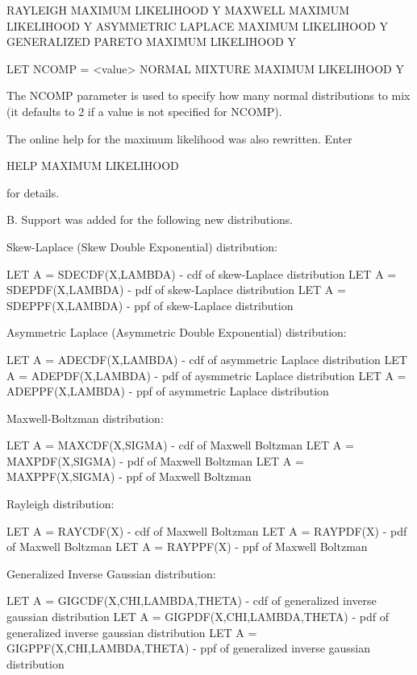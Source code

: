 {             RAYLEIGH MAXIMUM LIKELIHOOD Y
             MAXWELL MAXIMUM LIKELIHOOD Y
             ASYMMETRIC LAPLACE MAXIMUM LIKELIHOOD Y
             GENERALIZED PARETO MAXIMUM LIKELIHOOD Y

             LET NCOMP = <value>
             NORMAL MIXTURE MAXIMUM LIKELIHOOD Y

          The NCOMP parameter is used to specify how many normal
          distributions to mix (it defaults to 2 if a value is not
          specified for NCOMP).

       The online help for the maximum likelihood was also rewritten.
       Enter

          HELP MAXIMUM LIKELIHOOD

       for details.

    B. Support was added for the following new distributions.

       Skew-Laplace (Skew Double Exponential) distribution:

       LET A = SDECDF(X,LAMBDA)    - cdf of skew-Laplace distribution
       LET A = SDEPDF(X,LAMBDA)    - pdf of skew-Laplace distribution
       LET A = SDEPPF(X,LAMBDA)    - ppf of skew-Laplace distribution

       Asymmetric Laplace (Asymmetric Double Exponential) distribution:

       LET A = ADECDF(X,LAMBDA)    - cdf of asymmetric Laplace
                                     distribution
       LET A = ADEPDF(X,LAMBDA)    - pdf of aysmmetric Laplace
                                     distribution
       LET A = ADEPPF(X,LAMBDA)    - ppf of asymmetric Laplace
                                     distribution

       Maxwell-Boltzman distribution:

       LET A = MAXCDF(X,SIGMA)     - cdf of Maxwell Boltzman
       LET A = MAXPDF(X,SIGMA)     - pdf of Maxwell Boltzman
       LET A = MAXPPF(X,SIGMA)     - ppf of Maxwell Boltzman

       Rayleigh distribution:

       LET A = RAYCDF(X)           - cdf of Maxwell Boltzman
       LET A = RAYPDF(X)           - pdf of Maxwell Boltzman
       LET A = RAYPPF(X)           - ppf of Maxwell Boltzman

       Generalized Inverse Gaussian distribution:

       LET A = GIGCDF(X,CHI,LAMBDA,THETA) - cdf of generalized inverse
                                            gaussian distribution
       LET A = GIGPDF(X,CHI,LAMBDA,THETA) - pdf of generalized inverse
                                            gaussian distribution
       LET A = GIGPPF(X,CHI,LAMBDA,THETA) - ppf of generalized inverse
                                            gaussian distribution

}
